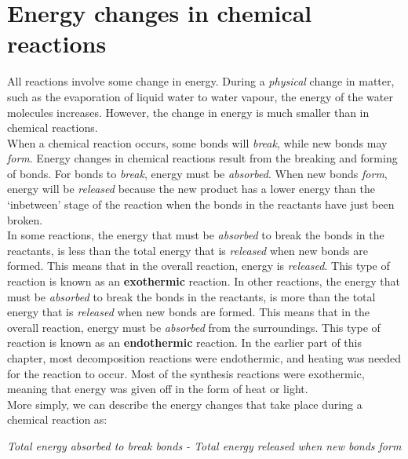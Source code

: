 



\section{Energy changes in chemical reactions}
\label{sec:physchem:energy}

All reactions involve some change in energy. During a \textit{physical} change in matter, such as the evaporation of liquid water to water vapour, the energy of the water molecules increases. However, the change in energy is much smaller than in chemical reactions.\\

When a chemical reaction occurs, some bonds will \textit{break}, while new bonds may \textit{form}. Energy changes in chemical reactions result from the breaking and forming of bonds. For bonds to \textit{break}, energy must be \textit{absorbed}. When new bonds \textit{form}, energy will be \textit{released} because the new product has a lower energy than the `inbetween' stage of the reaction when the bonds in the reactants have just been broken.\\

In some reactions, the energy that must be \textit{absorbed} to break the bonds in the reactants, is less than 
the total energy that is \textit{released} when new bonds are formed. This means that in the overall reaction, energy is \textit{released}. This type of reaction is known as an \textbf{exothermic} reaction. In other reactions, the energy that must be \textit{absorbed} to break the bonds in the reactants, is more than the total energy that is \textit{released} when new bonds are formed. This means that in the overall reaction, energy must be \textit{absorbed} from the surroundings. This type of reaction is known as an \textbf{endothermic} reaction. In the earlier part of this chapter, most decomposition reactions were endothermic, and heating was needed for the reaction to occur. Most of the synthesis reactions were exothermic, meaning that energy was given off in the form of heat or light.
\\

More simply, we can describe the energy changes that take place during a chemical reaction as:

\begin{center}
\textit{Total energy absorbed to break bonds - Total energy released when new bonds form}
\end{center}

